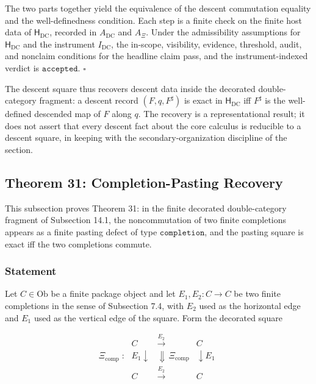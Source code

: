 \documentclass[11pt]{article}
\theoremstyle{definition}
\begin{document}
The two parts together yield the equivalence of the descent commutation equality and the well-definedness condition. Each step is a finite check on the finite host data of \(\mathsf H_{\mathrm{DC}}\), recorded in \(A_{\mathrm{DC}}\) and \(A_{\Xi}\). Under the admissibility assumptions for \(\mathsf H_{\mathrm{DC}}\) and the instrument \(I_{\mathrm{DC}}\), the in-scope, visibility, evidence, threshold, audit, and nonclaim conditions for the headline claim pass, and the instrument-indexed verdict is \(\texttt{accepted}\). \(\square\)

The descent square thus recovers descent data inside the decorated double-category fragment: a descent record \((F,q,F^{\sharp})\) is exact in \(\mathsf H_{\mathrm{DC}}\) iff \(F^{\sharp}\) is the well-defined descended map of \(F\) along \(q\). The recovery is a representational result; it does not assert that every descent fact about the core calculus is reducible to a descent square, in keeping with the secondary-organization discipline of the section.

\subsection{Theorem 31: Completion-Pasting Recovery}

This subsection proves Theorem 31: in the finite decorated double-category fragment of Subsection 14.1, the noncommutation of two finite completions appears as a finite pasting defect of type \(\texttt{completion}\), and the pasting square is exact iff the two completions commute.

\subsubsection{Statement}

Let \(C\in\mathrm{Ob}\) be a finite package object and let \(E_{1},E_{2}:C\to C\) be two finite completions in the sense of Subsection 7.4, with \(E_{2}\) used as the horizontal edge and \(E_{1}\) used as the vertical edge of the square. Form the decorated square

\[
\Xi_{\mathrm{comp}}\;:\;
\begin{array}{ccc}
C & \xrightarrow{E_{2}} & C\\
{\scriptstyle E_{1}}\downarrow & \Downarrow\,\Xi_{\mathrm{comp}} & \downarrow{\scriptstyle E_{1}}\\
C & \xrightarrow{E_{2}} & C
\end{array}
\]
\end{document}

